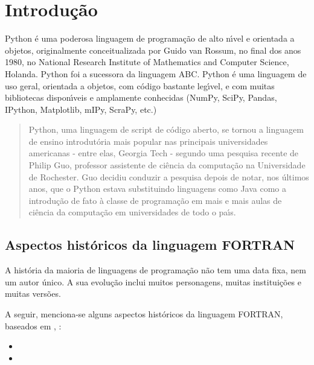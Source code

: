 


\chapter{ Introdu\c{c}\~{a}o}

Python \'{e} uma poderosa linguagem de programa\c{c}\~{a}o de alto n\'{\i}vel e orientada a objetos, originalmente conceitualizada por Guido van Rossum, no final dos anos 1980, no National Research Institute of Mathematics and Computer Science, Holanda. Python foi a sucessora da linguagem ABC. Python \'{e} uma linguagem  de uso geral, orientada a objetos, com c\'{o}digo bastante leg\'{\i}vel, e com muitas bibliotecas dispon\'{\i}veis e amplamente conhecidas (NumPy, SciPy, Pandas, IPython, Matplotlib, mIPy, ScraPy, etc.)
\begin{quote}
  Python, uma linguagem de script de c\'{o}digo aberto, se tornou a linguagem de ensino introdut\'{o}ria mais popular nas principais universidades americanas - entre elas, Georgia Tech - segundo uma pesquisa recente de Philip Guo, professor assistente de ci\^{e}ncia da computa\c{c}\~{a}o na Universidade de Rochester. Guo decidiu conduzir a pesquisa depois de notar, nos \'{u}ltimos anos, que o Python estava substituindo linguagens como Java como a introdu\c{c}\~{a}o de fato \`{a} classe de programa\c{c}\~{a}o em mais e mais aulas de ci\^{e}ncia da computa\c{c}\~{a}o em universidades de todo o pa\'{\i}s. \cite{Shein2015}
\end{quote}


   \section{Aspectos hist\'{o}ricos da linguagem FORTRAN}

A hist\'{o}ria da maioria de linguagens de programa\c{c}\~{a}o n\~{a}o tem uma data fixa, nem um autor \'{u}nico. A sua evolu\c{c}\~{a}o inclui muitos personagens, muitas institui\c{c}\~{o}es e muitas vers\~{o}es.

A seguir, menciona-se alguns aspectos hist\'{o}ricos da linguagem FORTRAN, baseados em \cite{Backus1998}, \cite{Adams1996} :
\begin{itemize}
  \item
  \item
\end{itemize}


